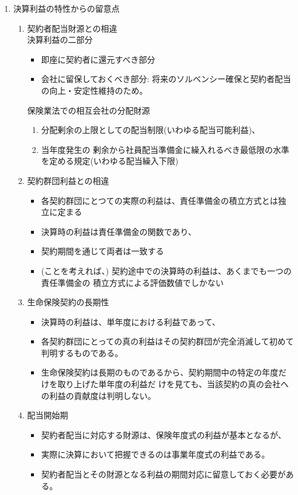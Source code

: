 \documentclass[report,gutter=10mm,fore-edge=10mm,uplatex,dvipdfmx]{jlreq}
\begin{document}
\begin{enumerate}
 \item 決算利益の特性からの留意点
\begin{enumerate}
 \item 契約者配当財源との相違\\
決算利益の二部分
\begin{itemize}
 \item 即座に契約者に還元すべき部分
 \item 会社に留保しておくべき部分: 将来のソルベンシー確保と契約者配当
の向上・安定性維持のため。
\end{itemize}
保険業法での相互会社の分配財源
\begin{enumerate}
 \item 分配剰余の上限としての配当制限(いわゆる配当可能利益)、
 \item 当年度発生の
剰余から社員配当準備金に繰入れるべき最低限の水準を定める規定(いわゆる配当繰入下限)
\end{enumerate}
 \item 契約群団利益との相違
\begin{itemize}
 \item 各契約群団にとつての実際の利益は、責任準備金の積立方式とは独立に定まる
 \item 決算時の利益は責任準備金の関数であり、
 \item 契約期間を通じて両者は一致する
 \item (ことを考えれば、) 契約途中での決算時の利益は、あくまでも一つの責任準備金の
積立方式による評価数値でしかない
\end{itemize}
 \item 生命保険契約の長期性
\begin{itemize}
 \item 決算時の利益は、単年度における利益であって、
 \item 各契約群団にとっての真の利益はその契約群団が完全消滅して初めて判明するものである。
 \item 生命保険契約は長期のものであるから、契約期間中の特定の年度だけを取り上げた単年度の利益だ
けを見ても、当該契約の真の会社への利益の貢献度は判明しない。
\end{itemize}
 \item 配当開始期
\begin{itemize}
 \item 契約者配当に対応する財源は、保険年度式の利益が基本となるが、
 \item 実際に決算において把握できるのは事業年度式の利益である。
 \item 契約者配当とその財源となる利益の期間対応に留意しておく必要がある。

\end{itemize}
\end{enumerate}
\end{enumerate}
\end{document}
